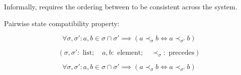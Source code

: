 
\begin{frame}{}
  \centerline{\Huge {}}
\end{frame}

\begin{frame}{}
  \begin{definition}
    Informally, \wlspec{} requires the ordering between  to be consistent across the system.
  \end{definition}

  \pause
  \vspace{1.00cm}
  \centerline{Pairwise state compatibility property:}
  \[
    \forall \sigma, \sigma': a, b \in \sigma \cap \sigma' \implies (a \prec_{\sigma} b \iff a \prec_{\sigma'} b)
  \]

  \[
    (\sigma, \sigma': \text{ list}; \quad a, b: \text{ element}; \quad \prec_{\sigma}: \text{ precedes})
  \]
\end{frame}

\begin{frame}{}
  \[
    \forall \sigma, \sigma': a, b \in \sigma \cap \sigma' \implies (a \prec_{\sigma} b \iff a \prec_{\sigma'} b)
  \]

  \begin{columns}
      \vspace{-0.60cm}
      \pause
      \vspace{-0.60cm}
  \end{columns}
\end{frame}
